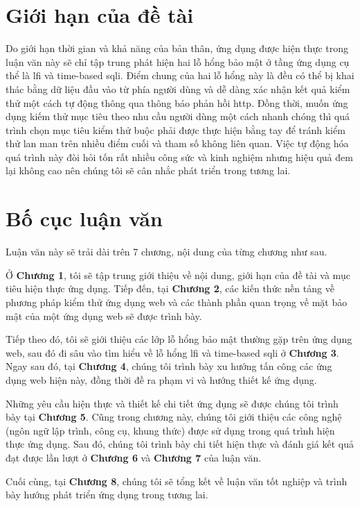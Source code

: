 \section{Giới hạn của đề tài}
Do giới hạn thời gian và khả năng của bản thân, ứng dụng được hiện thực trong luận văn này sẽ chỉ tập trung phát hiện hai lỗ hổng bảo mật ở tầng ứng dụng cụ thể là \acrfull{lfi} và time-based \acrfull{sqli}. Điểm chung của hai lỗ hổng này là đều có thể bị khai thác bằng dữ liệu đầu vào từ phía người dùng và dễ dàng xác nhận kết quả kiểm thử một cách tự động thông qua thông báo phản hồi \acrshort{http}. Đồng thời, muốn ứng dụng kiếm thử mục tiêu theo nhu cầu người dùng một cách nhanh chóng thì quá trình chọn mục tiêu kiểm thử buộc phải được thực hiện bằng tay để tránh kiểm thử lan man trên nhiều điểm cuối và tham số không liên quan. Việc tự động hóa quá trình này đòi hỏi tốn rất nhiều công sức và kinh nghiệm nhưng hiệu quả đem lại không cao nên chúng tôi sẽ cân nhắc phát triển trong tương lai.

\section{Bố cục luận văn}
Luận văn này sẽ trải dài trên 7 chương, nội dung của từng chương như sau. \par
Ở \textbf{Chương 1}, tôi sẽ tập trung giới thiệu về nội dung, giới hạn của đề tài và mục tiêu hiện thực ứng dụng. Tiếp đến, tại \textbf{Chương 2}, các kiến thức nền tảng về phương pháp kiểm thử ứng dụng web và các thành phần quan trọng về mặt bảo mật của một ứng dụng web sẽ được trình bày. \par
Tiếp theo đó, tôi sẽ giới thiệu các lớp lỗ hổng bảo mật thường gặp trên ứng dụng web, sau đó đi sâu vào tìm hiểu về lỗ hổng \acrshort{lfi} và time-based \acrshort{sqli} ở \textbf{Chương 3}. Ngay sau đó, tại \textbf{Chương 4}, chúng tôi trình bày xu hướng tấn công các ứng dụng web hiện này, đồng thời đề ra phạm vi và hướng thiết kế ứng dụng.\par
Những yêu cầu hiện thực và thiết kế chi tiết ứng dụng sẽ được chúng tôi trình bày tại \textbf{Chương 5}. Cũng trong chương này, chúng tôi giới thiệu các công nghệ (ngôn ngữ lập trình, công cụ, khung thức) được sử dụng trong quá trình hiện thực ứng dụng. Sau đó, chúng tôi trình bày chi tiết hiện thực và đánh giá kết quả đạt được lần lượt ở \textbf{Chương 6} và \textbf{Chương 7} của luận văn. \par
Cuối cùng, tại \textbf{Chương 8}, chúng tôi sẽ tổng kết về luận văn tốt nghiệp và trình bày hướng phát triển ứng dụng trong tương lai.
